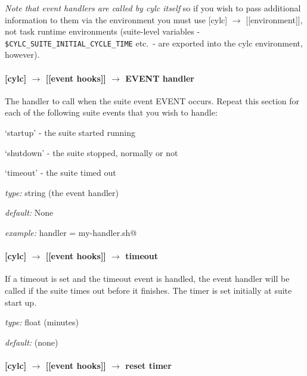 {\em Note that event handlers are called by cylc itself} so if you wish
to pass additional information to them via the environment you must use
[cylc] $\rightarrow$ [[environment]], not task runtime environments
(suite-level variables - \lstinline=$CYLC_SUITE_INITIAL_CYCLE_TIME=
etc.\ - are exported into the cylc environment, however).

\paragraph[EVENT handler]{[cylc] $\rightarrow$ [[event hooks]] $\rightarrow$ EVENT handler}

The handler to call when the suite event EVENT occurs. Repeat this
section for each of the following suite events that you wish to handle:
\begin{myitemize}
    \item `startup' - the suite started running 
    \item `shutdown' - the suite stopped, normally or not
    \item `timeout' - the suite timed out
\end{myitemize}

\begin{myitemize}
    \item {\em type:} string (the event handler)
    \item {\em default:} None
    \item {\em example:} \lstinline@startup handler = my-handler.sh@
\end{myitemize}

\paragraph[timeout]{[cylc] $\rightarrow$ [[event hooks]] $\rightarrow$ timeout}

If a timeout is set and the timeout event is handled, the event
handler will be called if the suite times out before it finishes.
The timer is set initially at suite start up. 

\begin{myitemize}
    \item {\em type:} float (minutes)
    \item {\em default:} (none)
\end{myitemize}

\paragraph[reset timer]{[cylc] $\rightarrow$ [[event hooks]] $\rightarrow$ reset timer}

